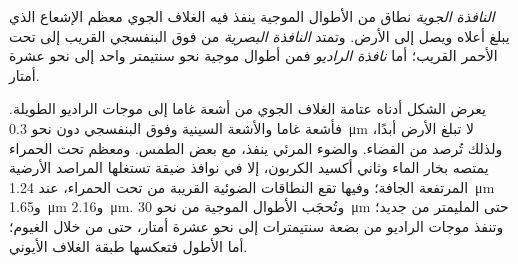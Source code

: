 \begin{definition}\label{def:b1:observing-the-sky:window}
\emph{النافذة الجوية} نطاق من الأطوال الموجية ينفذ فيه الغلاف الجوي معظم الإشعاع الذي يبلغ أعلاه ويصل إلى الأرض. وتمتد \emph{النافذة البصرية} من فوق البنفسجي القريب إلى تحت الأحمر القريب؛ أما \emph{نافذة الراديو} فمن أطوال موجية نحو سنتيمتر واحد إلى نحو عشرة أمتار.
\end{definition}

يعرض الشكل أدناه عتامة الغلاف الجوي من أشعة غاما إلى موجات الراديو الطويلة. فأشعة غاما والأشعة السينية وفوق البنفسجي دون نحو \qty{0.3}{\micro\metre} لا تبلغ الأرض أبدًا، ولذلك تُرصد من الفضاء. والضوء المرئي ينفذ، مع بعض الطمس. ومعظم تحت الحمراء يمتصه بخار الماء وثاني أكسيد الكربون، إلا في نوافذ ضيقة تستغلها المراصد الأرضية المرتفعة الجافة؛ وفيها تقع النطاقات الضوئية القريبة من تحت الحمراء، عند \qty{1.24}{\micro\metre} و\qty{1.65}{\micro\metre} و\qty{2.16}{\micro\metre}. وتُحجَب الأطوال الموجية من نحو \qty{30}{\micro\metre} حتى المليمتر من جديد؛ وتنفذ موجات الراديو من بضعة سنتيمترات إلى نحو عشرة أمتار، حتى من خلال الغيوم؛ أما الأطول فتعكسها طبقة الغلاف الأيوني.

